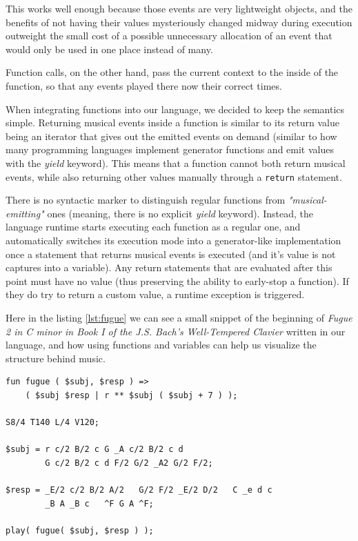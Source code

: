 \documentclass[a4paper,UKenglish,cleveref, autoref]{oasics-v2019}
\begin{document}
This works well enough because those events are very lightweight objects, and the benefits of not having their values mysteriously changed midway during execution outweight the small cost of a possible unnecessary allocation of an event that would only be used in one place instead of many.

Function calls, on the other hand, pass the current context to the inside of the function, so  that any events played there now their correct times.

When integrating functions into our language, we decided to keep the semantics simple. Returning musical events inside a function is similar to its return value being an iterator that gives out the emitted events on demand (similar to how many programming languages implement generator functions and emit values with the \textit{yield} keyword). This means that a function cannot both return musical events, while also returning other values manually through a \texttt{return} statement.

There is no syntactic marker to distinguish regular functions from \textit{"musical-emitting"} ones (meaning, there is no explicit \textit{yield} keyword). Instead, the language runtime starts executing each function as a regular one, and automatically switches its execution mode into a generator-like implementation once a statement that returns musical events is executed (and it's value is not captures into a variable). Any return statements that are evaluated after this point must have no value (thus preserving the ability to early-stop a function). If they do try to return a custom value, a runtime exception is triggered.

Here in the listing \ref{lst:fugue} we can see a small snippet of the beginning of \textit{Fugue 2 in C minor in Book I of the J.S. Bach’s Well-Tempered Clavier} written in our language, and how using functions and variables can help us visualize the structure behind music.

\begin{lstlisting}[label={lst:fugue},caption={Using variables and functions to compose musical arrangements},captionpos=t,abovecaptionskip=-\medskipamount]
fun fugue ( $subj, $resp ) => 
    ( $subj $resp | r ** $subj ( $subj + 7 ) );

S8/4 T140 L/4 V120;

$subj = r c/2 B/2 c G _A c/2 B/2 c d
        G c/2 B/2 c d F/2 G/2 _A2 G/2 F/2;

$resp = _E/2 c/2 B/2 A/2   G/2 F/2 _E/2 D/2   C _e d c
        _B A _B c   ^F G A ^F;

play( fugue( $subj, $resp ) );
\end{lstlisting}
\end{document}
